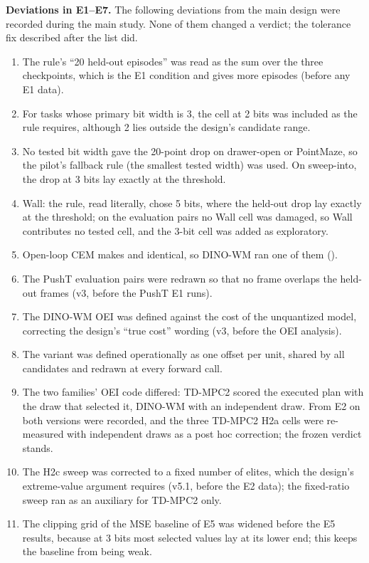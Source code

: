 \textbf{Deviations in E1--E7.} The following deviations from the main design were recorded during the main study. None of them changed a verdict; the tolerance fix described after the list did.
\begin{enumerate}\setlength{\itemsep}{0pt}\setlength{\parskip}{0pt}
\item The rule's ``20 held-out episodes'' was read as the sum over the three checkpoints, which is the E1 condition and gives more episodes (before any E1 data).
\item For tasks whose primary bit width is 3, the cell at 2 bits was included as the rule requires, although 2 lies outside the design's candidate range.
\item No tested bit width gave the 20-point drop on drawer-open or PointMaze, so the pilot's fallback rule (the smallest tested width) was used. On sweep-into, the drop at 3 bits lay exactly at the threshold.
\item Wall: the rule, read literally, chose 5 bits, where the held-out drop lay exactly at the threshold; on the evaluation pairs no Wall cell was damaged, so Wall contributes no tested cell, and the 3-bit cell was added as exploratory.
\item Open-loop CEM makes \shstep and \shep identical, so DINO-WM ran one of them (\shplan).
\item The PushT evaluation pairs were redrawn so that no frame overlaps the held-out frames (v3, before the PushT E1 runs).
\item The DINO-WM OEI was defined against the cost of the unquantized model, correcting the design's ``true cost'' wording (v3, before the OEI analysis).
\item The variant \detshift was defined operationally as one offset per unit, shared by all candidates and redrawn at every forward call.
\item The two families' OEI code differed: TD-MPC2 scored the executed plan with the draw that selected it, DINO-WM with an independent draw. From E2 on both versions were recorded, and the three TD-MPC2 H2a cells were re-measured with independent draws as a post hoc correction; the frozen verdict stands.
\item The H2c sweep was corrected to a fixed number of elites, which the design's extreme-value argument requires (v5.1, before the E2 data); the fixed-ratio sweep ran as an auxiliary for TD-MPC2 only.
\item The clipping grid of the MSE baseline of E5 was widened before the E5 results, because at 3 bits most selected values lay at its lower end; this keeps the baseline from being weak.

\end{enumerate}
